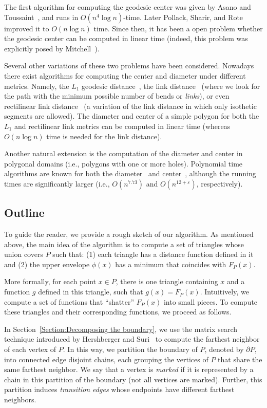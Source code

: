 \documentclass[a4paper,UKenglish]{lipics}
\newcommand{\F}[2]{\ensuremath{F_{\scriptscriptstyle #1}(#2)}}
\begin{document}
The first algorithm for computing the geodesic center was given by Asano and Toussaint~\cite{at-cgcsp-85}, and runs in $O(n^4\log n)$-time. Later Pollack, Sharir, and Rote~\cite{pollackComputingCenter} improved it to $O(n\log n)$ time. Since then, it has been a open problem whether the geodesic center can be
computed in linear time (indeed, this problem was explicitly posed by Mitchell~\cite{m-gspno-00}).

Several other variations of these two problems have been considered. Nowadays there exist algorithms for computing the center and diameter under different metrics. Namely, the $L_1$ geodesic distance~\cite{bkow-clgdcsplt-13},  the link distance~\cite{suri-mlpprp-87,k-ealdp-89,dls-aclcsp-92} (where we look for the path with the minimum possible number of bends or {\em links}), or even rectilinear link distance~\cite{ns-crldp-91,ns-oarlcrp-96} (a variation of the link distance in which only isothetic segments are allowed). The diameter and center of a simple polygon for both the $L_1$ and rectilinear link metrics can be computed in linear time (whereas $O(n\log n)$ time is needed for the link distance).

Another natural extension is the computation of the diameter and center in polygonal domains (i.e., polygons with one or more holes). Polynomial time algorithms are known for both the diameter~\cite{bko-gdpd-13} and center~\cite{bko-cgcpd-14}, although the running times are significantly larger (i.e., $O(n^{7.73})$ and $O(n^{12+\varepsilon})$, respectively).

\subsection{Outline}
To guide the reader, we provide a rough sketch of our algorithm.
As mentioned above, the main idea of the algorithm is to compute a set of triangles whose union covers $P$ such that:
(1) each triangle has a distance function defined in it and (2) the upper envelope $\phi(x)$ has a minimum that coincides with $\F{P}{x}$.

More formally, for each point $x\in P$, there is one triangle containing $x$ and a function $g$ defined in this triangle, such that $g(x) = \F{P}{x}$. Intuitively, we compute a set of functions that ``shatter'' $\F{P}{x}$ into small pieces. 
To compute these triangles and their corresponding functions, we proceed as follows.

In Section~\ref{Section:Decomposing the boundary}, we use the matrix search technique introduced by Hershberger and Suri~\cite{hershberger1993matrix} to compute the farthest neighbor of each vertex of $P$. 
In this way, we partition the boundary of $P$, denoted by $\partial P$, into connected edge disjoint chains,
each grouping the vertices of $P$ that share the same farthest neighbor. 
We say that a vertex is \emph{marked} if it is represented by a chain in this partition of the boundary (not all vertices are marked). 
Further, this partition induces \emph{transition edges} whose endpoints have different farthest neighbors. 
\end{document}
